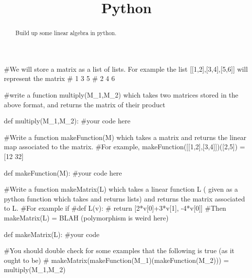 \documentclass{ximera}
\title{Python}
\begin{document}
\begin{abstract}
  Build up some linear algebra in python.
\end{abstract}

\begin{python}
#We will store a matrix as a list of lists.   For example the list [[1,2],[3,4],[5,6]] will represent the matrix 
# 1 3 5
# 2 4 6
		
#write a function multiply(M_1,M_2) which takes two matrices stored in the above format, and returns the matrix of their product
		
def multiply(M_1,M_2):
  #your code here
		
#Write a function makeFunction(M) which takes a matrix and returns the linear map associated to the matrix.
#For example, makeFunction([[1,2],[3,4]])([2,5]) = [12 32]
		
def makeFunction(M):
  #your code here
		
#Write a function makeMatrix(L) which takes a linear function L ( given as a python function which takes and returns lists) and returns the matrix associated to L.
#For example if  
#def L(v):
#  return [2*v[0]+3*v[1], -4*v[0]]
#Then makeMatrix(L) = BLAH (polymorphism is weird here)
		
def makeMatrix(L):
  #your code 

  #You should double check for some examples that the following is true (as it ought to be)
  # makeMatrix(makeFunction(M_1)(makeFunction(M_2))) = multiply(M_1,M_2)
\end{python}

	
\end{document}

